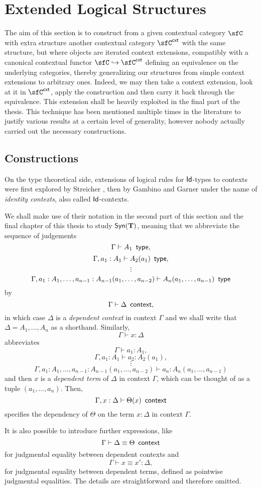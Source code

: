 \chapter{Extended Logical Structures}

The aim of this section is to construct from a given contextual category $\sfC$
with extra structure another contextual category $\sfC^{\cxt}$ with the same
structure, but where objects are iterated context extensions, compatibly with a
canonical contextual functor $\sfC\hookrightarrow\sfC^{\cxt}$ defining an
equivalence on the underlying categories, thereby
generalizing our structures from simple context extensions to arbitrary ones.
Indeed, we may then take a context extension, look at it in $\sfC^{\cxt}$, apply
the construction and then carry it back through the equivalence. This extension
shall be heavily exploited in the final part of the thesis. This technique has
been mentioned multiple times in the literature to justify various results at a
certain level of generality, however nobody actually carried out the necessary
constructions.

\section{Constructions}

On the type theoretical side, extensions of logical rules for $\operatorname{\mathsf{Id}}$-types to
contexts were first explored by Streicher \cite{Str93}, then by Gambino and
Garner \cite{GG08} under the name of \emph{identity contexts}, also called
$\operatorname{\mathsf{Id}}$-contexts.

\begin{notation}
  We shall make use of their notation \cite[4]{GG08} in the second part of this
  section and the final chapter of this thesis to study $\mathsf{Syn}(\mathbf{\operatorname{\mathbf{T}}})$, meaning that
  we abbreviate the sequence of judgements
  \[\Gamma\vdash A_1\operatorname{\ \mathsf{type}},\]
  \[\Gamma,a_1:A_1\vdash A_2(a_1)\operatorname{\ \mathsf{type}},\]
  \[\vdots\]
  \[\Gamma,a_1:A_1,\ldots,a_{n-1}:A_{n-1}(a_1,\ldots,a_{n-2})\vdash
  A_n(a_1,\ldots,a_{n-1})\operatorname{\ \mathsf{type}}\]
  by
  \[\Gamma\vdash\Delta\operatorname{\ \mathsf{context}},\]
  in which case $\Delta$ is a \emph{dependent context} in context $\Gamma$ and
  we shall write that $\Delta=A_1,\ldots,A_n$ as a shorthand.
  Similarly,
  \[\Gamma\vdash x:\Delta\]
  abbreviates
  \[\Gamma\vdash a_1:A_1,\]
  \[\Gamma,a_1:A_1\vdash a_2:A_2(a_1),\]
  \[\vdots\]
  \[\Gamma,a_1:A_1,\ldots,a_{n-1}:A_{n-1}(a_1,\ldots,a_{n-2})\vdash
  a_n:A_n(a_1,\ldots,a_{n-1})\]
  and then $x$ is a \emph{dependent term} of $\Delta$ in context $\Gamma$, which
  can be thought of as a tuple $(a_1,\ldots,a_n)$. Then,
  \[\Gamma,x:\Delta\vdash\Theta(x)\operatorname{\ \mathsf{context}}\]
  specifies the dependency of $\Theta$ on the term $x:\Delta$ in context
  $\Gamma$.

  \noindent
  It is also possible to introduce further expressions, like
  \[\Gamma\vdash \Delta\equiv\Theta\operatorname{\ \mathsf{context}}\]
  for judgmental equality between dependent contexts and
  \[\Gamma\vdash x\equiv x':\Delta,\]
  for judgmental equality between dependent terms, defined as pointwise
  judgmental equalities. The details are straightforward and therefore omitted.
\end{notation}
\noindent

